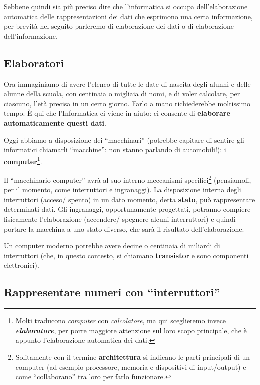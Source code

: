 Sebbene quindi sia più preciso dire che l'informatica si occupa dell'elaborazione automatica delle rappresentazioni dei dati che esprimono una certa informazione, per brevità nel seguito parleremo di elaborazione dei dati o di elaborazione dell'informazione.

\subsection{Elaboratori }\label{elaboratori}

Ora immaginiamo di avere l'elenco di tutte le date di nascita degli alunni e delle alunne della scuola, con centinaia o migliaia di nomi, e di voler calcolare, per ciascuno, l'età precisa in un certo giorno. Farlo a mano richiederebbe moltissimo tempo. È qui che l'Informatica ci viene in aiuto: ci consente di \textbf{elaborare automaticamente questi dati}.

Oggi abbiamo a disposizione dei ``macchinari'' (potrebbe capitare di sentire gli informatici chiamarli ``macchine'': non stanno parlando di automobili!): i \textbf{computer}\footnote{Molti traducono \emph{computer} con \emph{calcolatore}, ma qui sceglieremo invece \emph{\textbf{elaboratore}}, per porre maggiore attenzione sul loro scopo principale, che è appunto l'elaborazione automatica dei dati.}.

Il ``macchinario computer'' avrà al suo interno meccanismi specifici\footnote{Solitamente con il termine \textbf{architettura} si indicano le parti principali di un computer (ad esempio processore, memoria e dispositivi di input/output) e come ``collaborano'' tra loro per farlo funzionare.} (pensiamoli, per il momento, come interruttori e ingranaggi). La disposizione interna degli interruttori (acceso/ spento) in un dato momento, detta \textbf{stato}, può rappresentare determinati dati. Gli ingranaggi, opportunamente progettati, potranno compiere fisicamente l'elaborazione (accendere/ spegnere alcuni interruttori) e quindi portare la macchina a uno stato diverso, che sarà il risultato dell'elaborazione.

Un computer moderno potrebbe avere decine o centinaia di miliardi di interruttori (che, in questo contesto, si chiamano \textbf{transistor} e sono componenti elettronici).

\subsection{Rappresentare numeri con ``interruttori'' }\label{rappresentare-numeri-con-interruttori}

